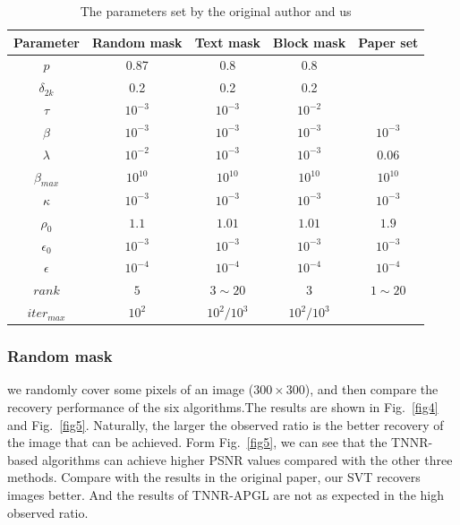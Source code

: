 \documentclass{article}
\begin{document}
{\begin{table}
	\caption{The parameters set by the original author and us}
	\label{t1}
	\centering
	\renewcommand{\arraystretch}{1.25} 
	\begin{tabular}{ccccc}
		\toprule
		Parameter  & Random mask & Text mask  & Block mask & Paper set\\
		\midrule
		$p$ & 0.87 & 0.8 & 0.8 & \\
		$\delta_{2k}$ & 0.2 & 0.2 & 0.2 & \\ 
		$\tau$ & $10^{-3}$ & $10^{-3}$ & $10^{-2}$ & \\
		$\beta$  & $10^{-3}$  & $10^{-3}$ & $10^{-3}$ & $10^{-3}$\\
		$\lambda$ & $ 10^{-2} $ & $10^{-3}$ & $10^{-3}$ & $0.06$\\
		$\beta_{max}$ & $10^{10}$ & $10^{10}$ & $10^{10}$ & $10^{10}$\\
		$\kappa$ & $10^{-3}$ & $10^{-3}$ & $10^{-3}$ & $10^{-3}$\\
		$\rho_0$ & $1.1$ & $1.01$ & $1.01$ & $1.9$\\
		$\epsilon_0$ & $10^{-3}$ & $10^{-3}$ & $10^{-3}$ & $10^{-3}$\\
		$\epsilon$ & $10^{-4}$ & $10^{-4}$ & $10^{-4}$ & $10^{-4}$\\
		$rank$ & $5$ & $3\sim 20$ & $3$ & $1\sim 20$\\
		$iter_{max}$ & $10^2$ & $10^2/10^3$ & $10^2/10^3$ & \\
		\bottomrule
	\end{tabular}
\end{table}

\subsubsection{Random mask}
\label{random}
we randomly cover some pixels of an image ($300 \times 300$), and then compare the recovery performance of the six algorithms.The results are shown in Fig.~\ref{fig4} and Fig.~\ref{fig5}. Naturally, the larger the observed ratio is the better recovery of the image that can be achieved. Form Fig.~\ref{fig5}, we can see that the TNNR-based algorithms can achieve higher PSNR values compared with the other three methods. Compare with the results in the original paper, our SVT recovers images better. And the results of TNNR-APGL are not as expected in the high observed ratio.

}
\end{document}
